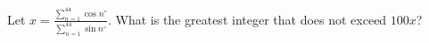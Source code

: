 Let $x=\frac{\displaystyle\sum_{n=1}^{44} \cos n^\circ}{\displaystyle \sum_{n=1}^{44} \sin n^\circ}.$  What is the greatest integer that does not exceed $100x$?